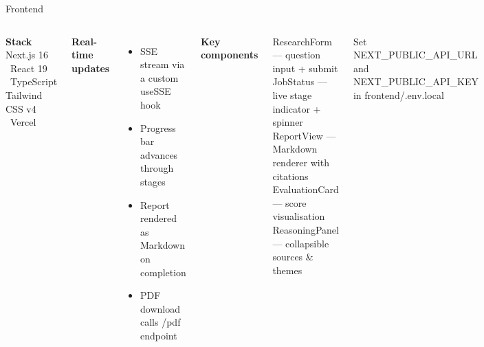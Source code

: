 \documentclass[aspectratio=169, 10pt]{beamer}
\newcommand{\code}[1]{{\ttfamily\small\color{code-red}#1}}
\newcommand{\sidenote}[1]{%
  \vspace{0.2em}%
  \noindent\colorbox{yellow!18}{%
    \parbox{\dimexpr\linewidth-2\fboxsep\relax}{\tiny\color{black!70}#1}%
  }\vspace{0.1em}%
}
\begin{document}
\begin{frame}{Frontend}
  \begin{columns}[T]
      \textbf{\color{aims-blue}Stack}\\[0.2em]
      Next.js 16 \textbullet\ React 19 \textbullet\ TypeScript\\
      Tailwind CSS v4 \textbullet\ Vercel
      \vspace{0.5em}

      \textbf{\color{aims-blue}Real-time updates}
      \begin{itemize}
        \item SSE stream via a custom \code{useSSE} hook
        \item Progress bar advances through stages
        \item Report rendered as Markdown on completion
        \item PDF download calls \code{/pdf} endpoint
      \end{itemize}
      \textbf{\color{aims-blue}Key components}
      \begin{block}{}
        \scriptsize
        \code{ResearchForm} --- question input + submit\\[0.2em]
        \code{JobStatus} --- live stage indicator + spinner\\[0.2em]
        \code{ReportView} --- Markdown renderer with citations\\[0.2em]
        \code{EvaluationCard} --- score visualisation\\[0.2em]
        \code{ReasoningPanel} --- collapsible sources \& themes
      \end{block}
      \vspace{0.3em}
      \sidenote{Set \code{NEXT\_PUBLIC\_API\_URL} and \code{NEXT\_PUBLIC\_API\_KEY} in \code{frontend/.env.local}}
  \end{columns}
\end{frame}
\end{document}
